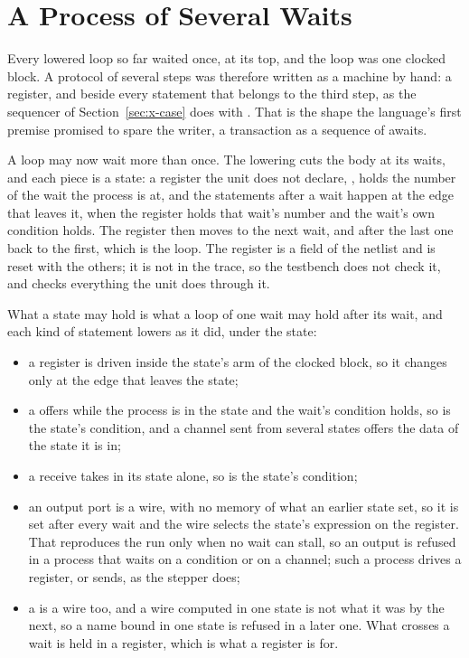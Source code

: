 \section{A Process of Several Waits}
\label{sec:x-seq}

Every lowered loop so far waited once, at its top, and the loop was
one clocked block. A protocol of several steps was therefore written
as a machine by hand: a  register, and 
beside every statement that belongs to the third step, as the
sequencer of Section~\ref{sec:x-case} does with . That
is the shape the language's first premise promised to spare the
writer, a transaction as a sequence of awaits.

A loop may now wait more than once. The lowering cuts the body at
its waits, and each piece is a state: a register the unit does not
declare, , holds the number of the wait the process is
at, and the statements after a wait happen at the edge that leaves
it, when the register holds that wait's number and the wait's own
condition holds. The register then moves to the next wait, and after
the last one back to the first, which is the loop. The register is a
field of the netlist and is reset with the others; it is not in the
trace, so the testbench does not check it, and checks everything the
unit does through it.

What a state may hold is what a loop of one wait may hold after its
wait, and each kind of statement lowers as it did, under the state:

\begin{itemize}
  \item a register is driven inside the state's arm of the clocked
        block, so it changes only at the edge that leaves the state;
  \item a  offers while the process is in the state and the
        wait's condition holds, so  is the state's
        condition, and a channel sent from several states offers the
        data of the state it is in;
  \item a receive takes in its state alone, so  is the
        state's condition;
  \item an output port is a wire, with no memory of what an earlier
        state set, so it is set after every wait and the wire selects
        the state's expression on the register. That reproduces the
        run only when no wait can stall, so an output is refused in a
        process that waits on a condition or on a channel; such a
        process drives a register, or sends, as the stepper does;
  \item a  is a wire too, and a wire computed in one state is
        not what it was by the next, so a name bound in one state is
        refused in a later one. What crosses a wait is held in a
        register, which is what a register is for.
\end{itemize}

